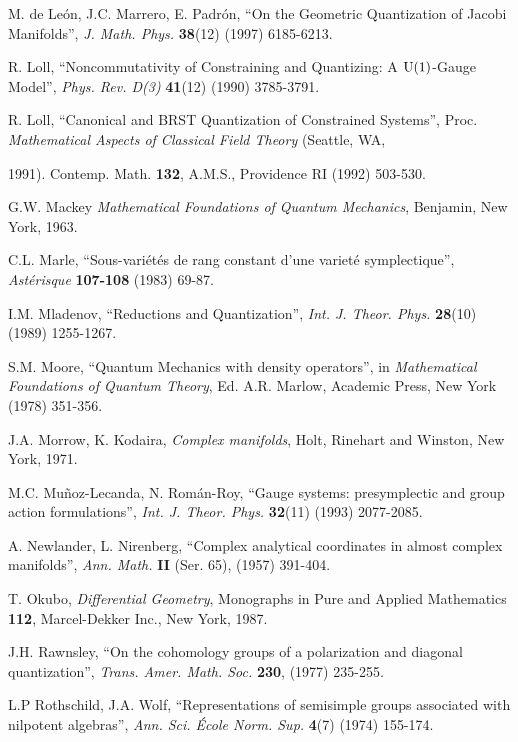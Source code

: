 \documentclass[12pt]{article}
\theoremstyle{plain}
\begin{document}
\begin{thebibliography}{55}
{\sc M. de Le\'on, J.C. Marrero, E. Padr\'on},
``On the Geometric Quantization of Jacobi Manifolds'',
{\it J. Math. Phys.} {\bf 38}(12) (1997) 6185-6213.

{\sc R. Loll},
``Noncommutativity of Constraining and Quantizing: A ${\rm U}(1)$-Gauge
Model'',
{\it Phys. Rev. D(3)} {\bf 41}(12) (1990) 3785-3791.

{\sc R. Loll},
``Canonical and BRST Quantization of Constrained Systems'',
Proc. {\it Mathematical Aspects of Classical Field Theory} (Seattle, WA,

1991).
Contemp. Math. {\bf 132}, A.M.S., Providence RI (1992) 503-530.

{\sc G.W. Mackey}
{\it Mathematical Foundations of Quantum Mechanics},
Benjamin, New York, 1963.

{\sc C.L. Marle},
``Sous-vari\'et\'es de rang constant d'une variet\'e symplectique'',
{\it Ast\'erisque} {\bf 107-108} (1983) 69-87.

{\sc I.M. Mladenov},
``Reductions and Quantization'',
{\it Int. J. Theor. Phys.} {\bf 28}(10) (1989) 1255-1267.

{\sc S.M. Moore},
``Quantum Mechanics with density operators'',
in {\it Mathematical Foundations of Quantum Theory},
Ed. A.R. Marlow, Academic Press, New York (1978) 351-356.

{\sc J.A. Morrow, K. Kodaira},
{\it Complex manifolds},
Holt, Rinehart and Winston, New York, 1971.

{\sc M.C. Mu\~noz-Lecanda, N. Rom\'an-Roy},
``Gauge systems: presymplectic and group action formulations'',
{\it Int. J. Theor. Phys.} {\bf 32}(11) (1993) 2077-2085.

{\sc A. Newlander, L. Nirenberg},
``Complex analytical coordinates in almost complex manifolds'',
{\it Ann. Math.} {\bf II} (Ser. 65),
(1957) 391-404.

{\sc T. Okubo},
{\it Differential Geometry},
Monographs in Pure and Applied Mathematics
{\bf 112}, Marcel-Dekker Inc., New York, 1987.

{\sc J.H. Rawnsley},
``On the cohomology groups of a polarization and diagonal
quantization'',
{\it Trans. Amer. Math. Soc.}
{\bf 230}, (1977) 235-255.

{\sc L.P Rothschild, J.A. Wolf},
``Representations of semisimple groups associated with nilpotent
algebras'',
{\it Ann. Sci. \'Ecole Norm. Sup.} {\bf 4}(7) (1974) 155-174.


\end{thebibliography}
\end{document}
